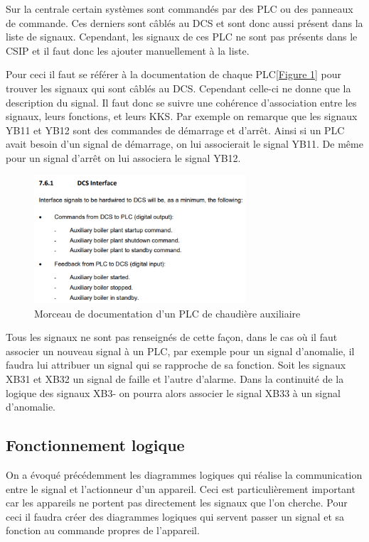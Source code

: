 \documentclass[11pt, openright]{book}
\begin{document}
Sur la centrale certain systèmes sont commandés par des PLC ou des panneaux de commande. Ces derniers sont câblés au DCS et sont donc aussi présent dans la liste de signaux. Cependant, les signaux de ces PLC ne sont pas présents dans le CSIP et il faut donc les ajouter manuellement à la liste.

Pour ceci il faut se référer à la documentation de chaque PLC[\hyperref[fig:PLC]{Figure \ref{fig:PLC}}] pour trouver les signaux qui sont câblés au DCS. Cependant celle-ci ne donne que la description du signal. Il faut donc se suivre une cohérence d'association entre les signaux, leurs fonctions, et leurs KKS. Par exemple on remarque que les signaux YB11 et YB12 sont des commandes de démarrage et d'arrêt.
Ainsi si un PLC avait besoin d’un signal de démarrage, on lui associerait le signal YB11. De même pour un signal d'arrêt on lui associera le signal YB12.


\begin{figure}[ht!]
    \centering
    \includegraphics[width=0.7\textwidth]{./object/PLC.png}
    \caption{Morceau de documentation d'un PLC de chaudière auxiliaire}
    \label{fig:PLC}
\end{figure}

Tous les signaux ne sont pas renseignés de cette façon, dans le cas où il faut associer un nouveau signal à un PLC, par exemple pour un signal d'anomalie, il faudra lui attribuer un signal qui se rapproche de sa fonction. Soit les signaux XB31 et XB32 un signal de faille et l'autre d'alarme. Dans la continuité de la logique des signaux XB3- on pourra alors associer le signal XB33 à un signal d'anomalie.

\subsection{Fonctionnement logique}

On a évoqué précédemment les diagrammes logiques qui réalise la communication entre le signal et l'actionneur d'un appareil. Ceci est particulièrement important car les appareils ne portent pas directement les signaux que l'on cherche. Pour ceci il faudra créer des diagrammes logiques qui servent passer un signal et sa fonction au commande propres de l'appareil.
\end{document}
